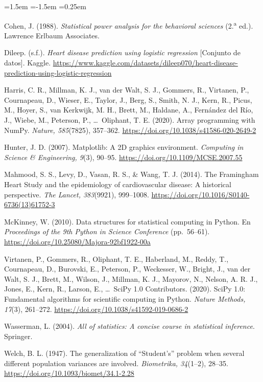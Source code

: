\documentclass[11pt,a4paper]{article}
\begin{document}
\begin{list}{}{\leftmargin=1.5em \itemindent=-1.5em \itemsep=0.25em \parsep=0pt}\small\raggedright
\item Cohen, J. (1988). \textit{Statistical power analysis for the behavioral sciences} (2.\textsuperscript{a} ed.). Lawrence Erlbaum Associates.
\item Dileep. (s.f.). \textit{Heart disease prediction using logistic regression} [Conjunto de datos]. Kaggle. \url{https://www.kaggle.com/datasets/dileep070/heart-disease-prediction-using-logistic-regression}
\item Harris, C. R., Millman, K. J., van der Walt, S. J., Gommers, R., Virtanen, P., Cournapeau, D., Wieser, E., Taylor, J., Berg, S., Smith, N. J., Kern, R., Picus, M., Hoyer, S., van Kerkwijk, M. H., Brett, M., Haldane, A., Fernández del Río, J., Wiebe, M., Peterson, P., \dots\ Oliphant, T. E. (2020). Array programming with NumPy. \textit{Nature, 585}(7825), 357--362. \url{https://doi.org/10.1038/s41586-020-2649-2}
\item Hunter, J. D. (2007). Matplotlib: A 2D graphics environment. \textit{Computing in Science \& Engineering, 9}(3), 90--95. \url{https://doi.org/10.1109/MCSE.2007.55}
\item Mahmood, S. S., Levy, D., Vasan, R. S., \& Wang, T. J. (2014). The Framingham Heart Study and the epidemiology of cardiovascular disease: A historical perspective. \textit{The Lancet, 383}(9921), 999--1008. \url{https://doi.org/10.1016/S0140-6736(13)61752-3}
\item McKinney, W. (2010). Data structures for statistical computing in Python. En \textit{Proceedings of the 9th Python in Science Conference} (pp.~56--61). \url{https://doi.org/10.25080/Majora-92bf1922-00a}
\item Virtanen, P., Gommers, R., Oliphant, T. E., Haberland, M., Reddy, T., Cournapeau, D., Burovski, E., Peterson, P., Weckesser, W., Bright, J., van der Walt, S. J., Brett, M., Wilson, J., Millman, K. J., Mayorov, N., Nelson, A. R. J., Jones, E., Kern, R., Larson, E., \dots\ SciPy 1.0 Contributors. (2020). SciPy 1.0: Fundamental algorithms for scientific computing in Python. \textit{Nature Methods, 17}(3), 261--272. \url{https://doi.org/10.1038/s41592-019-0686-2}
\item Wasserman, L. (2004). \textit{All of statistics: A concise course in statistical inference}. Springer.
\item Welch, B. L. (1947). The generalization of ``Student's'' problem when several different population variances are involved. \textit{Biometrika, 34}(1--2), 28--35. \url{https://doi.org/10.1093/biomet/34.1-2.28}

\end{list}
\end{document}
